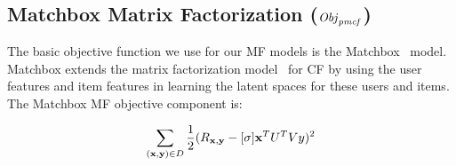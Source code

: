 \subsection{Matchbox Matrix Factorization ($\mathit{Obj}_{\mathit{pmcf}} $)}

The basic objective function we use for our MF models is the Matchbox~\cite{matchbox} model. Matchbox extends the matrix factorization model~\cite{pmf}  for CF by using the user features and item features in learning the latent spaces for these users and items. The Matchbox MF objective component is:

\begin{align}
\sum_{(\mathbf{x},\mathbf{y}) \in D} \frac{1}{2} (R_{\mathbf{x},\mathbf{y}} - [\sigma] \mathbf{x}^T U^T V y)^2
\end{align}

